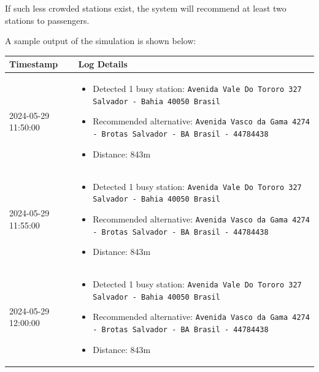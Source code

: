 \documentclass[11pt]{article} %
\begin{document}
If such less crowded stations exist, the system will recommend at least two stations to passengers.

A sample output of the simulation is shown below:

\begin{longtable}{p{4cm}p{10cm}}
	\toprule
	\textbf{Timestamp} & \textbf{Log Details} \\
	\midrule
	2024-05-29 11:50:00 & 
\begin{itemize}
	\item Detected 1 busy station: \texttt{Avenida Vale Do Tororo 327 Salvador - Bahia 40050 Brasil}
	\item Recommended alternative: \texttt{Avenida Vasco da Gama 4274 - Brotas Salvador - BA Brasil - 44784438}
	\item Distance: 843m
\end{itemize} \\
\hline

2024-05-29 11:55:00 & 
\begin{itemize}
	\item Detected 1 busy station: \texttt{Avenida Vale Do Tororo 327 Salvador - Bahia 40050 Brasil}
	\item Recommended alternative: \texttt{Avenida Vasco da Gama 4274 - Brotas Salvador - BA Brasil - 44784438}
	\item Distance: 843m
\end{itemize} \\
\hline

2024-05-29 12:00:00 & 
\begin{itemize}
	\item Detected 1 busy station: \texttt{Avenida Vale Do Tororo 327 Salvador - Bahia 40050 Brasil}
	\item Recommended alternative: \texttt{Avenida Vasco da Gama 4274 - Brotas Salvador - BA Brasil - 44784438}
	\item Distance: 843m
\end{itemize} \\
\bottomrule
\end{longtable}
\end{document}

